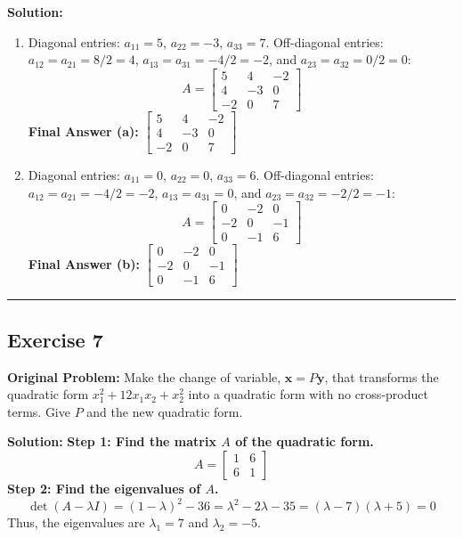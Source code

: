 \documentclass[11pt, letterpaper]{article}
\theoremstyle{definition}
\theoremstyle{remark}
\begin{document}
\textbf{Solution:}
\begin{enumerate}[label=\alph*.]
    \item Diagonal entries: $a_{11} = 5$, $a_{22} = -3$, $a_{33} = 7$. Off-diagonal entries: $a_{12} = a_{21} = 8/2 = 4$, $a_{13} = a_{31} = -4/2 = -2$, and $a_{23} = a_{32} = 0/2 = 0$:
    \[
    A = \begin{bmatrix} 5 & 4 & -2 \\ 4 & -3 & 0 \\ -2 & 0 & 7 \end{bmatrix}
    \]
    \textbf{Final Answer (a):} $\begin{bmatrix} 5 & 4 & -2 \\ 4 & -3 & 0 \\ -2 & 0 & 7 \end{bmatrix}$

    \item Diagonal entries: $a_{11} = 0$, $a_{22} = 0$, $a_{33} = 6$. Off-diagonal entries: $a_{12} = a_{21} = -4/2 = -2$, $a_{13} = a_{31} = 0$, and $a_{23} = a_{32} = -2/2 = -1$:
    \[
    A = \begin{bmatrix} 0 & -2 & 0 \\ -2 & 0 & -1 \\ 0 & -1 & 6 \end{bmatrix}
    \]
    \textbf{Final Answer (b):} $\begin{bmatrix} 0 & -2 & 0 \\ -2 & 0 & -1 \\ 0 & -1 & 6 \end{bmatrix}$
\end{enumerate}

\medskip\hrule\medskip

\subsection*{Exercise 7}
\textbf{Original Problem:} Make the change of variable, $\mathbf{x} = P\mathbf{y}$, that transforms the quadratic form $x_1^2 + 12x_1x_2 + x_2^2$ into a quadratic form with no cross-product terms. Give $P$ and the new quadratic form.

\textbf{Solution:}
\textbf{Step 1: Find the matrix $A$ of the quadratic form.}
\[
A = \begin{bmatrix} 1 & 6 \\ 6 & 1 \end{bmatrix}
\]
\textbf{Step 2: Find the eigenvalues of $A$.}
\[
\det(A - \lambda I) = (1 - \lambda)^2 - 36 = \lambda^2 - 2\lambda - 35 = (\lambda - 7)(\lambda + 5) = 0
\]
Thus, the eigenvalues are $\lambda_1 = 7$ and $\lambda_2 = -5$.
\end{document}
